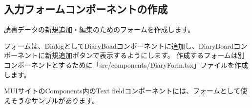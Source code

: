 \subsection{入力フォームコンポーネントの作成}
\keeplastskip{
  \label{sec:3-3-7}
  \label{sec-0337}
  \par\nobreak
}

読書データの新規追加・編集のためのフォームを作成します。

\vspace*{\baselineskip}

フォームは、DialogとしてDiaryBoadコンポーネントに追加し、DiaryBoardコンポーネントに新規追加ボタンで表示するようにします。
作成するフォームは別コンポーネントとするために「src/components/DiaryForm.tsx」ファイルを作成します。


\clearpage


MUIサイトのComponents内のText fieldコンポーネントには、フォームとして使えそうなサンプルがあります。

